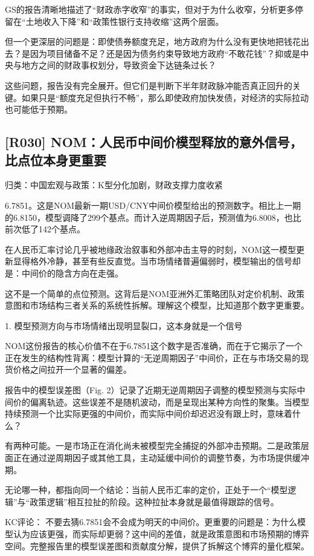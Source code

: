 \documentclass[11pt]{ctexart}
\begin{document}
GS的报告清晰地描述了“财政赤字收窄”的事实，但对于为什么收窄，分析更多停留在“土地收入下降”和“政策性银行支持收缩”这两个层面。

但一个更深层的问题是：即使债券额度充足，地方政府为什么没有更快地把钱花出去？是因为项目储备不足？还是因为债务约束导致地方政府“不敢花钱”？抑或是中央与地方之间的财政事权划分，导致资金下达链条过长？

这些问题，报告没有完全展开。但它们是判断下半年财政脉冲能否真正回升的关键。如果只是“额度充足但执行不畅”，那么即使政府加快发债，对经济的实际拉动也可能低于预期。

\subsection{[R030] NOM：人民币中间价模型释放的意外信号，比点位本身更重要}
{\small\color{refgray}归类：中国宏观与政策：K型分化加剧，财政支撑力度收紧}

6.7851。这是NOM最新一期USD/CNY中间价模型给出的预测数字。相比上一期的6.8150，模型调降了299个基点。而计入逆周期因子后，预测值为6.8008，也比前次低了142个基点。

在人民币汇率讨论几乎被地缘政治叙事和外部冲击主导的时刻，NOM这一模型更新显得格外冷静，甚至有些反直觉。当市场情绪普遍偏弱时，模型输出的信号却是：中间价的隐含方向在走强。

这不是一个简单的点位预测。这背后是NOM亚洲外汇策略团队对定价机制、政策意图和市场结构三者关系的系统性拆解。理解这个模型，比知道那个数字更重要。

1. 模型预测方向与市场情绪出现明显裂口，这本身就是一个信号

NOM这份报告的核心价值不在于6.7851这个数字是否准确，而在于它揭示了一个正在发生的结构性背离：模型计算的“无逆周期因子”中间价，正在与市场交易的现货价格之间拉开一个显著的偏差。

报告中的模型误差图（Fig. 2）记录了近期无逆周期因子调整的模型预测与实际中间价的偏离轨迹。这些误差不是随机波动，而是呈现出某种方向性的聚集。当模型持续预测一个比实际更强的中间价，而实际中间价却迟迟没有跟上时，意味着什么？

有两种可能。一是市场正在消化尚未被模型完全捕捉的外部冲击预期。二是政策层面正在通过逆周期因子或其他工具，主动延缓中间价的调整节奏，为市场提供缓冲期。

无论哪一种，都指向同一个结论：当前人民币汇率的定价，正处于一个“模型逻辑”与“政策逻辑”相互拉扯的阶段。这种拉扯本身就是最值得跟踪的信号。

KC评论： 不要去猜6.7851会不会成为明天的中间价。更重要的问题是：为什么模型认为应该更强，而实际却更弱？这中间的差值，就是政策意图和市场预期的博弈空间。完整报告里的模型误差图和贡献度分解，提供了拆解这个博弈的量化框架。
\end{document}
